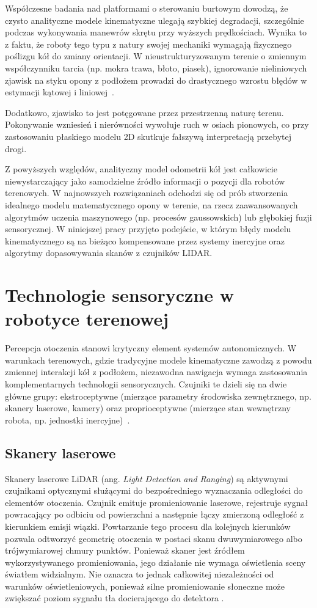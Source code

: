 \documentclass[a4paper,twoside,12pt]{book}
\begin{document}
Współczesne badania nad platformami o sterowaniu burtowym dowodzą, że czysto analityczne modele kinematyczne ulegają szybkiej degradacji, szczególnie podczas wykonywania manewrów skrętu przy wyższych prędkościach. Wynika to z faktu, że roboty tego typu z natury swojej mechaniki wymagają fizycznego poślizgu kół do zmiany orientacji. W nieustrukturyzowanym terenie o zmiennym współczynniku tarcia (np. mokra trawa, błoto, piasek), ignorowanie nieliniowych zjawisk na styku opony z podłożem prowadzi do drastycznego wzrostu błędów w estymacji kątowej i liniowej~\cite{trivedi2024probabilistic}.

Dodatkowo, zjawisko to jest potęgowane przez przestrzenną naturę terenu. Pokonywanie wzniesień i nierówności wywołuje ruch w osiach pionowych, co przy zastosowaniu płaskiego modelu 2D skutkuje fałszywą interpretacją przebytej drogi. 

Z powyższych względów, analityczny model odometrii kół jest całkowicie niewystarczający jako samodzielne źródło informacji o pozycji dla robotów terenowych. W najnowszych rozwiązaniach odchodzi się od prób stworzenia idealnego modelu matematycznego opony w terenie, na rzecz zaawansowanych algorytmów uczenia maszynowego (np. procesów gaussowskich) lub głębokiej fuzji sensorycznej. W niniejszej pracy przyjęto podejście, w którym błędy modelu kinematycznego są na bieżąco kompensowane przez systemy inercyjne oraz algorytmy dopasowywania skanów z czujników LIDAR.

\section{Technologie sensoryczne w robotyce terenowej}
Percepcja otoczenia stanowi krytyczny element systemów autonomicznych. W warunkach terenowych, gdzie tradycyjne modele kinematyczne zawodzą z powodu zmiennej interakcji kół z podłożem, niezawodna nawigacja wymaga zastosowania komplementarnych technologii sensorycznych. Czujniki te dzieli się na dwie główne grupy: ekstroceptywne (mierzące parametry środowiska zewnętrznego, np. skanery laserowe, kamery) oraz proprioceptywne (mierzące stan wewnętrzny robota, np. jednostki inercyjne)~\cite{mi15040531}.

\subsection{Skanery laserowe}

Skanery laserowe LiDAR (ang. \textit{Light Detection and Ranging}) są aktywnymi czujnikami optycznymi służącymi do bezpośredniego wyznaczania odległości do elementów otoczenia. Czujnik emituje promieniowanie laserowe, rejestruje sygnał powracający po odbiciu od powierzchni a następnie łączy zmierzoną odległość z kierunkiem emisji wiązki. Powtarzanie tego procesu dla kolejnych kierunków pozwala odtworzyć geometrię otoczenia w postaci skanu dwuwymiarowego albo trójwymiarowej chmury punktów. Ponieważ skaner jest źródłem wykorzystywanego promieniowania, jego działanie nie wymaga oświetlenia sceny światłem widzialnym. Nie oznacza to jednak całkowitej niezależności od warunków oświetleniowych, ponieważ silne promieniowanie słoneczne może zwiększać poziom sygnału tła docierającego do detektora \cite{behroozpour2017lidar}.
\end{document}
